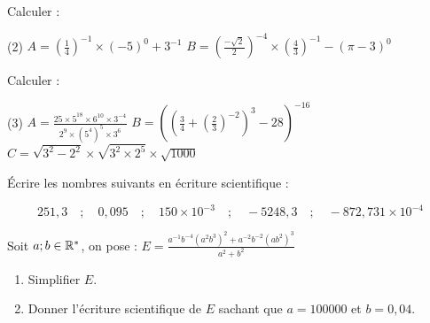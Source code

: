 \documentclass[10pt, a4paper]{article}
\begin{document}
\newpage


\begin{Application}[][10 min]
 Calculer :
\begin{tasks}[label=$\bullet$, label-width=5pt, item-indent=15pt](2)
\task $A = \left(\frac{1}{4}\right)^{-1} \times (-5)^0 + 3^{-1}$
\task $B = \left(\frac{-\sqrt{2}}{2}\right)^{-4} \times \left(\frac{4}{3}\right)^{-1} - (\pi - 3)^0$
\end{tasks}
\end{Application}

\begin{Application}[][15 min]
Calculer :

\begin{tasks}[label=$\bullet$, label-width=5pt, item-indent=15pt](3)
  \task $A = \frac{25 \times 5^{18} \times 6^{10} \times 3^{-4}}{2^9 \times (5^4)^5 \times 3^6}$
  \task $B = \left(\left(\frac{3}{4} + \left(\frac{2}{3}\right)^{-2}\right)^3 - 28\right)^{-16}$
  \task $C = \sqrt{3^2 - 2^2} \times \sqrt{3^2 \times 2^5} \times \sqrt{1000}$
\end{tasks}
\end{Application}

\begin{Application}[][10 min]
Écrire les nombres suivants en écriture scientifique :

\[
251{,}3 \quad ; \quad 0{,}095  \quad ; \quad 150 \times 10^{-3} \quad ; \quad -5248{,}3 \quad ; \quad -872{,}731 \times 10^{-4}
\]
\end{Application}

\begin{Application}[][10 min]
Soit $a ; b \in \mathbb{R}^*$, on pose : \quad
$E = \frac{a^{-1}b^{-4}\left(a^2b^3\right)^2 + a^{-2}b^{-2}\left(ab^2\right)^3}{a^2 + b^2}$
\begin{enumerate}
    \item Simplifier $E$.
    \item Donner l'écriture scientifique de $E$ sachant que $a = 100000$ et $b = 0{,}04$.
\end{enumerate}
\end{Application}
\end{document}
